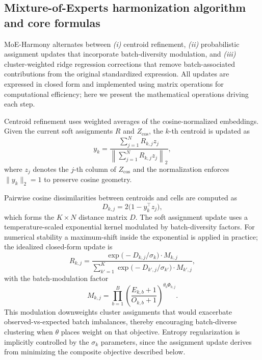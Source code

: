 \documentclass{article}
\begin{document}
\subsection{Mixture-of-Experts harmonization algorithm and core formulas}

MoE-Harmony alternates between \textit{(i)} centroid refinement, \textit{(ii)} probabilistic assignment updates that incorporate batch-diversity modulation, and \textit{(iii)} cluster-weighted ridge regression corrections that remove batch-associated contributions from the original standardized expression. All updates are expressed in closed form and implemented using matrix operations for computational efficiency; here we present the mathematical operations driving each step.

Centroid refinement uses weighted averages of the cosine-normalized embeddings. Given the current soft assignments $R$ and $Z_{\mathrm{cos}}$, the $k$-th centroid is updated as
\begin{equation}
    y_k = \frac{\sum_{j=1}^N R_{k,j} z_j}{\left\| \sum_{j=1}^N R_{k,j} z_j \right\|_2},
\end{equation}
where $z_j$ denotes the $j$-th column of $Z_{\mathrm{cos}}$ and the normalization enforces $\|y_k\|_2 = 1$ to preserve cosine geometry.

Pairwise cosine dissimilarities between centroids and cells are computed as
\begin{equation}
    D_{k,j} = 2 \bigl(1 - y_k^\top z_j \bigr),
\end{equation}
which forms the $K \times N$ distance matrix $D$. The soft assignment update uses a temperature-scaled exponential kernel modulated by batch-diversity factors. For numerical stability a maximum-shift inside the exponential is applied in practice; the idealized closed-form update is
\begin{equation}
    R_{k,j} = \frac{\exp\bigl(-D_{k,j} / \sigma_k\bigr) \cdot M_{k,j}}{\sum_{k'=1}^K \exp\bigl(-D_{k',j} / \sigma_{k'}\bigr) \cdot M_{k',j}},
\end{equation}
with the batch-modulation factor
\begin{equation}
    M_{k,j} = \prod_{b=1}^B \left( \frac{E_{k,b} + 1}{O_{k,b} + 1} \right)^{\theta_b \Phi_{b,j}}.
\end{equation}
This modulation downweights cluster assignments that would exacerbate observed-vs-expected batch imbalances, thereby encouraging batch-diverse clustering when $\theta$ places weight on that objective. Entropy regularization is implicitly controlled by the $\sigma_k$ parameters, since the assignment update derives from minimizing the composite objective described below.
\end{document}
